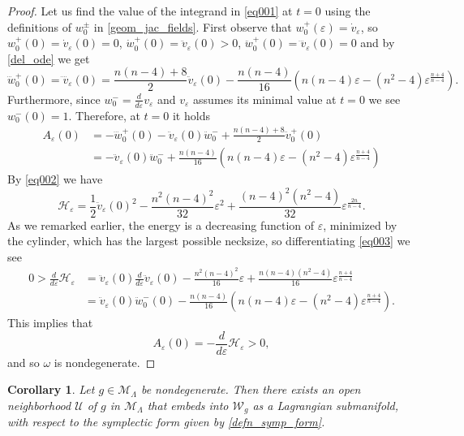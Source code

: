 \documentclass[reqno,11pt]{amsart}
\newtheorem{corollary}[theorem]{Corollary}
\theoremstyle{tttheorem}
\begin{document}
\begin{proof}
Let us find the value of the integrand in \eqref{eq001} at $t=0$ using the definitions of $w_0^\pm$ in \eqref{geom_jac_fields}. First observe that $w_0^+(\varepsilon) = \dot v_\varepsilon$, 
so $w_0^+ (0)  =  \dot v_\varepsilon (0) = 0$, $\dot w_0^+ (0)  =  \ddot v_\varepsilon (0) > 0$, $\ddot w_0^+(0)  =  \dddot v_\varepsilon (0) = 0$ and by \eqref{del_ode} we get
$$\dddot w_0^+ (0) = \ddddot v_\varepsilon (0)  =  \frac{n(n-4)+8}{2} \ddot v_\varepsilon(0) - \frac{n(n-4)}{16} 
\left ( n(n-4) \varepsilon - (n^2-4)\varepsilon^{\frac{n+4}{n-4}} \right ) .
$$
Furthermore, since $\displaystyle w_0^- = \frac{d}{d\varepsilon} v_\varepsilon$
and $v_\varepsilon$ assumes its minimal value at $t=0$ we see 
$w_0^-(0) =1$. Therefore, at $t=0$ it holds
\begin{align*}
    A_\varepsilon(0) & =-\dddot w_0^+(0)-\ddot v_\varepsilon(0)\ddot w_0^-+\frac{n(n-4)+8}{2}\ddot v_0^+(0)\\
    & =-\ddot v_\varepsilon(0)\ddot w_0^-+\frac{n(n-4)}{16} 
\left ( n(n-4) \varepsilon - (n^2-4)\varepsilon^{\frac{n+4}{n-4}} \right )
\end{align*}
By \eqref{eq002} we have
\begin{equation} \label{eq003}
\mathcal{H}_\varepsilon = \frac{1}{2} \ddot v_\varepsilon (0)^2 - \frac{n^2(n-4)^2}{32} 
\varepsilon^2 + \frac{(n-4)^2(n^2-4)}{32} \varepsilon^{\frac{2n}{n-4}} . 
\end{equation} 
As we remarked earlier, the energy is a decreasing function of $\varepsilon$, minimized by the 
cylinder, which has the largest possible necksize, so differentiating \eqref{eq003} we see 
\begin{align}
    0  >  \frac{d}{d\varepsilon} \mathcal{H}_\varepsilon & = \ddot v_\varepsilon (0) 
\frac{d}{d\varepsilon} \ddot v_\varepsilon (0) - \frac{n^2(n-4)^2}{16} \varepsilon 
+ \frac{n(n-4)(n^2-4)}{16} \varepsilon^{\frac{n+4}{n-4}} \\ \nonumber 
 & =  \ddot v_\varepsilon (0) \ddot w_0^- (0) - \frac{n(n-4)}{16}(n(n-4) \varepsilon 
- (n^2-4)\varepsilon^{\frac{n+4}{n-4}} ) .
\end{align}
This implies that
$$A_\varepsilon(0)=-\frac{d}{d\varepsilon}\mathcal H_\varepsilon>0,$$
and so $\omega$ is nondegenerate.
 \end{proof}

 \begin{corollary} 
 Let $g \in \mathcal{M}_\Lambda$ be nondegenerate. Then there exists an 
 open neighborhood $\mathcal{U}$ of $g$ in $\mathcal{M}_\Lambda$ that 
 embeds into $\mathcal{W}_g$ as a Lagrangian submanifold, with respect to 
 the symplectic form given by \eqref{defn_symp_form}. 
 \end{corollary} 
\end{document}
